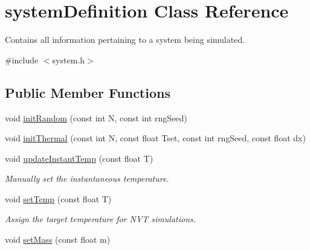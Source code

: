 \hypertarget{classsystem_definition}{\section{system\-Definition Class Reference}
\label{classsystem_definition}
}


Contains all information pertaining to a system being simulated.  




{\ttfamily \#include $<$system.\-h$>$}

\subsection*{Public Member Functions}
\begin{DoxyCompactItemize}
\item 
void \hyperlink{classsystem_definition_ae9db403f9fe40c07afe541187c2e61b5}{init\-Random} (const int N, const int rng\-Seed)
\item 
void \hyperlink{classsystem_definition_aaabd070a1531ab464a752dacc7854542}{init\-Thermal} (const int N, const float Tset, const int rng\-Seed, const float dx)
\item 
\hypertarget{classsystem_definition_a285e6cd1de35ed125eecb20f0f774ab3}{void \hyperlink{classsystem_definition_a285e6cd1de35ed125eecb20f0f774ab3}{update\-Instant\-Temp} (const float T)}\label{classsystem_definition_a285e6cd1de35ed125eecb20f0f774ab3}

\begin{DoxyCompactList}\small\item\em Manually set the instantaneous temperature. \end{DoxyCompactList}\item 
\hypertarget{classsystem_definition_a14a9ee5c342fcfaa9d5682bf5bac7bb9}{void \hyperlink{classsystem_definition_a14a9ee5c342fcfaa9d5682bf5bac7bb9}{set\-Temp} (const float T)}\label{classsystem_definition_a14a9ee5c342fcfaa9d5682bf5bac7bb9}

\begin{DoxyCompactList}\small\item\em Assign the target temperature for N\-V\-T simulations. \end{DoxyCompactList}\item 
\hypertarget{classsystem_definition_a34648bc27c7bbdf03220ad10da4d2987}{void \hyperlink{classsystem_definition_a34648bc27c7bbdf03220ad10da4d2987}{set\-Mass} (const float m)}\label{classsystem_definition_a34648bc27c7bbdf03220ad10da4d2987}


\end{DoxyCompactItemize}
